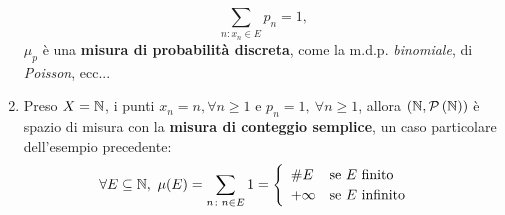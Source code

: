 \begin{exampleswt}
\begin{enumerate}
\begin{equation*}
	\sum_{n\colon x_n\in E}p_n=1,
\end{equation*}
$\mu_p$ è una \textbf{misura di probabilità discreta}, come la m.d.p. \textit{binomiale}, di \textit{Poisson}, ecc...\\
\item Preso $X=\mathbb{N}$, i punti $x_n=n, \forall n\geq 1$ e $p_n=1,\ \forall n\geq 1$, allora $\left(\mathbb{N},\mathcal{P}\left(\mathbb{N}\right)\right)$ è spazio di misura con la \textbf{misura di conteggio semplice}, un caso particolare dell'esempio precedente:
	\begin{equation}
	\forall E\subseteq\naturalset,\ \mu(E)=\sum_{n\colon n\in E}1=\begin{cases}
		\begin{array}{ll}
			\# E&\text{se }E\text{ finito}\\
			+\infty&\text{se }E\text{ infinito}
		\end{array}
	\end{cases}
\end{equation}
	\end{enumerate}
\end{exampleswt}
